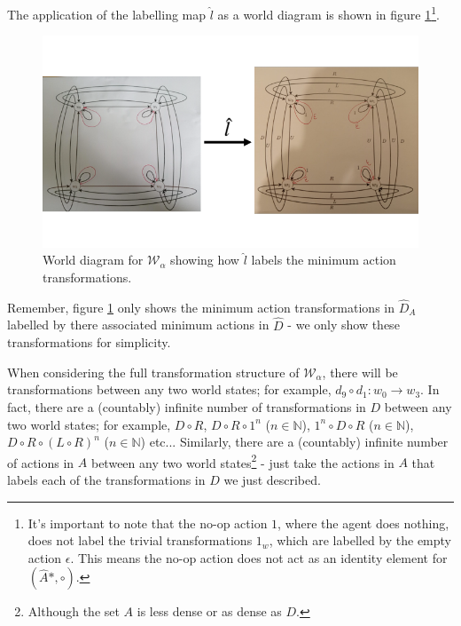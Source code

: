 The application of the labelling map $\hat{l}$ as a world diagram is shown in figure \ref{fig:2x2_cyclical_labelling_with_min_actions}\footnote{
	It's important to note that the no-op action $1$, where the agent does nothing, does not label the trivial transformations $1_{w}$, which are labelled by the empty action $\epsilon$.
	This means the no-op action does not act as an identity element for $(\hat{A}\ast, \circ)$.
}.

\begin{figure}[H]
	\centering
	\includegraphics[width=1\linewidth]{2MathematicalFramework/Images/2x2_cyclical_labelling_with_min_actions.png}
	\caption{
		World diagram for $\mathscr{W}_{\alpha}$ showing how $\hat{l}$ labels the minimum action transformations.
	}
\label{fig:2x2_cyclical_labelling_with_min_actions}
\end{figure}

Remember, figure \ref{fig:2x2_cyclical_labelling_with_min_actions} only shows the minimum action transformations in $\hat{D}_{A}$ labelled by there associated minimum actions in $\hat{D}$ - we only show these transformations for simplicity.

When considering the full transformation structure of $\mathscr{W}_{\alpha}$, there will be transformations between any two world states; for example, $d_{9} \circ d_{1}: w_{0} \to w_{3}$.
In fact, there are a (countably) infinite number of transformations in $D$ between any two world states; for example, $D \circ R$, $D \circ R \circ 1^{n}$ ($n \in \mathbb{N}$), $1^{n} \circ D \circ R$ ($n \in \mathbb{N}$), $D \circ R \circ (L \circ R)^{n}$ ($n \in \mathbb{N}$) etc...
Similarly, there are a (countably) infinite number of actions in $A$ between any two world states\footnote{Although the set $A$ is less dense or as dense as $D$. } - just take the actions in $A$ that labels each of the transformations in $D$ we just described.

